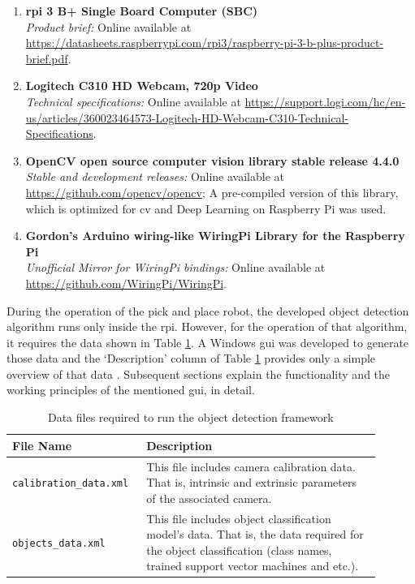 \documentclass[a4paper,12pt]{report}%
\begin{document}
\begin{enumerate}[1.]
	\item \textbf{\ac{rpi} 3 B+ Single Board Computer (SBC)}\\
	\textit{Product brief:} Online available at \url{https://datasheets.raspberrypi.com/rpi3/raspberry-pi-3-b-plus-product-brief.pdf}.
	
	\item \textbf{Logitech C310 HD Webcam, 720p Video}\\
	\textit{Technical specifications:} Online available at \url{https://support.logi.com/hc/en-us/articles/360023464573-Logitech-HD-Webcam-C310-Technical-Specifications}.
	
	\item \textbf{OpenCV open source computer vision library stable release 4.4.0}\cite{opencv_library} \\
	\textit{Stable and development releases:} Online available at \url{https://github.com/opencv/opencv}; A pre-compiled version of this library, which is optimized for \ac{cv} and Deep Learning on Raspberry Pi was used.
	
	\item \textbf{Gordon's Arduino wiring-like WiringPi Library for the Raspberry Pi}\cite{wiringpi} \\
	\textit{Unofficial Mirror for WiringPi bindings:} Online available at \url{https://github.com/WiringPi/WiringPi}.
	
\end{enumerate}


During the operation of the pick and place robot, the developed object detection algorithm runs only inside the \ac{rpi}. However, for the operation of that algorithm, it requires the data shown in Table \ref{table:datafiles}. A Windows \ac{gui} was developed to generate those data and the `Description' column of Table \ref{table:datafiles} provides only a simple overview of that data . Subsequent sections explain the functionality and the working principles of the mentioned \ac{gui}, in detail.\\

\begin{table}[h]
	\captionsetup{font=sc, labelsep=newline}
	\centering
	\caption{ Data files required to run the object detection framework}
	\begin{tabular}{|p{0.3\linewidth}  |p{0.6\linewidth}  |}
		\hline
		\textbf{File Name} & \textbf{Description}\\\hline
		{\tt calibration\_data.xml} & This file includes camera calibration data. That is, intrinsic and extrinsic parameters of the associated camera.\\ \hline
		{\tt objects\_data.xml} & This file includes object classification model's data. That is, the data required for the object classification (class names, trained support vector machines and etc.).\\
		\hline
	\end{tabular}
	\label{table:datafiles}
\end{table}
\end{document}
